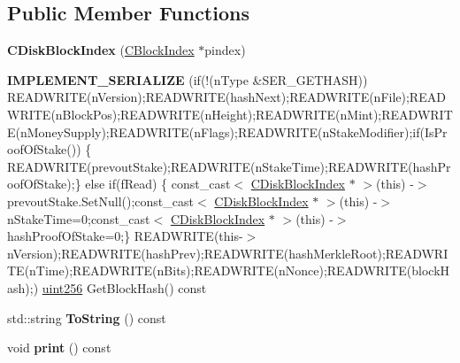 \subsection*{Public Member Functions}
\begin{DoxyCompactItemize}
\item 
\mbox{\label{class_c_disk_block_index_a1407006c4526260b57ec2d8b3abc707d}} 
{\bfseries C\+Disk\+Block\+Index} (\mbox{\hyperlink{class_c_block_index}{C\+Block\+Index}} $\ast$pindex)
\item 
\mbox{\label{class_c_disk_block_index_a0901cba3e54402461bc9c1a0af5639a4}} 
{\bfseries I\+M\+P\+L\+E\+M\+E\+N\+T\+\_\+\+S\+E\+R\+I\+A\+L\+I\+ZE} (if(!(n\+Type \&S\+E\+R\+\_\+\+G\+E\+T\+H\+A\+SH)) R\+E\+A\+D\+W\+R\+I\+TE(n\+Version);R\+E\+A\+D\+W\+R\+I\+TE(hash\+Next);R\+E\+A\+D\+W\+R\+I\+TE(n\+File);R\+E\+A\+D\+W\+R\+I\+TE(n\+Block\+Pos);R\+E\+A\+D\+W\+R\+I\+TE(n\+Height);R\+E\+A\+D\+W\+R\+I\+TE(n\+Mint);R\+E\+A\+D\+W\+R\+I\+TE(n\+Money\+Supply);R\+E\+A\+D\+W\+R\+I\+TE(n\+Flags);R\+E\+A\+D\+W\+R\+I\+TE(n\+Stake\+Modifier);if(Is\+Proof\+Of\+Stake()) \{ R\+E\+A\+D\+W\+R\+I\+TE(prevout\+Stake);R\+E\+A\+D\+W\+R\+I\+TE(n\+Stake\+Time);R\+E\+A\+D\+W\+R\+I\+TE(hash\+Proof\+Of\+Stake);\} else if(f\+Read) \{ const\+\_\+cast$<$ \mbox{\hyperlink{class_c_disk_block_index}{C\+Disk\+Block\+Index}} $\ast$ $>$(this) -\/$>$prevout\+Stake.\+Set\+Null();const\+\_\+cast$<$ \mbox{\hyperlink{class_c_disk_block_index}{C\+Disk\+Block\+Index}} $\ast$ $>$(this) -\/$>$n\+Stake\+Time=0;const\+\_\+cast$<$ \mbox{\hyperlink{class_c_disk_block_index}{C\+Disk\+Block\+Index}} $\ast$ $>$(this) -\/$>$hash\+Proof\+Of\+Stake=0;\} R\+E\+A\+D\+W\+R\+I\+TE(this-\/$>$n\+Version);R\+E\+A\+D\+W\+R\+I\+TE(hash\+Prev);R\+E\+A\+D\+W\+R\+I\+TE(hash\+Merkle\+Root);R\+E\+A\+D\+W\+R\+I\+TE(n\+Time);R\+E\+A\+D\+W\+R\+I\+TE(n\+Bits);R\+E\+A\+D\+W\+R\+I\+TE(n\+Nonce);R\+E\+A\+D\+W\+R\+I\+TE(block\+Hash);) \mbox{\hyperlink{classuint256}{uint256}} Get\+Block\+Hash() const
\item 
\mbox{\label{class_c_disk_block_index_a347eafa0667f8641f73062b48c217d61}} 
std\+::string {\bfseries To\+String} () const
\item 
\mbox{\label{class_c_disk_block_index_a06d1341c16b006c7d12ca0f62ffb2b10}} 
void {\bfseries print} () const
\end{DoxyCompactItemize}
